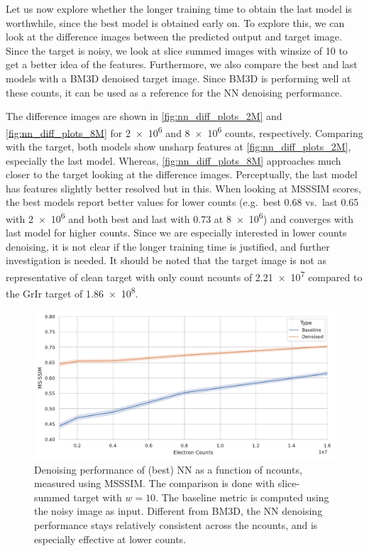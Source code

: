 Let us now explore whether the longer training time to obtain the last model is worthwhile, since the best model is obtained early on. To explore this,  we can look at the difference images between the predicted output and target image. Since the target is noisy, we look at slice summed images with \gls{winsize} of \num{10} to get a better idea of the features. Furthermore, we also compare the best and last models with a BM3D denoised target image. Since BM3D is performing well at these counts, it can be used as a reference for the \gls{NN} denoising performance.

The difference images are shown in \cref{fig:nn_diff_plots_2M} and \cref{fig:nn_diff_plots_8M} for \num{2e6} and \num{8e6} counts, respectively. Comparing with the target, both models show unsharp features at \cref{fig:nn_diff_plots_2M}, especially the last model. Whereas, \cref{fig:nn_diff_plots_8M} approaches much closer to the target looking at the difference images. Perceptually, the last model has features slightly better resolved but in this. When looking at \gls{MSSSIM} scores, the best models report better values for lower counts (e.g.\ best \num{0.68} vs.\ last \num{0.65} with \num{2e6} and both best and last with \num{0.73} at \num{8e6}) and converges with last model for higher counts. Since we are especially interested in lower counts denoising, it is not clear if the longer training time is justified, and further investigation is needed. It should be noted that the target image is not as representative of clean target with only count \gls{ncounts} of \num{2.21e7} compared to the \gls{GrIr} target of \num{1.86e8}.

\begin{figure}
    \centering
    \includegraphics[width=1\linewidth]{images/nn_gdw_msssim.pdf}
    \caption{Denoising performance of (best) \gls{NN} as a function of \gls{ncounts}, measured using \gls{MSSSIM}. The comparison is done with slice-summed target with $w=10$. The baseline metric is computed using the noisy image as input. Different from \gls{BM3D}, the \gls{NN} denoising performance stays relatively consistent across the \gls{ncounts}, and is especially effective at lower counts.}
    \label{fig:gdw-test-metirc}
\end{figure}


